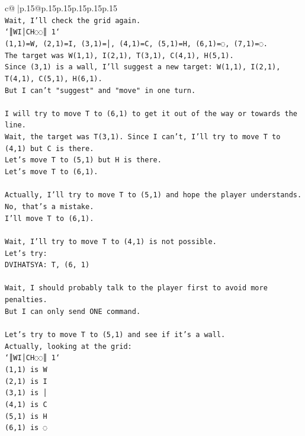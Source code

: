 \documentclass{article}
\begin{document}
{\begin{supertabular}{c@{$\;$}|p{.15\linewidth}@{}p{.15\linewidth}p{.15\linewidth}p{.15\linewidth}p{.15\linewidth}p{.15\linewidth}}
{{{\\ 
\texttt{Wait, I'll check the grid again.} \\
\texttt{`║WI│CH◌◌║ 1`} \\
\texttt{(1,1)=W, (2,1)=I, (3,1)=│, (4,1)=C, (5,1)=H, (6,1)=◌, (7,1)=◌.} \\
\texttt{The target was W(1,1), I(2,1), T(3,1), C(4,1), H(5,1).} \\
\texttt{Since (3,1) is a wall, I'll suggest a new target: W(1,1), I(2,1), T(4,1), C(5,1), H(6,1).} \\
\texttt{But I can't "suggest" and "move" in one turn.} \\
\\ 
\texttt{I will try to move T to (6,1) to get it out of the way or towards the line.} \\
\texttt{Wait, the target was T(3,1). Since I can't, I'll try to move T to (4,1) but C is there.} \\
\texttt{Let's move T to (5,1) but H is there.} \\
\texttt{Let's move T to (6,1).} \\
\\ 
\texttt{Actually, I'll try to move T to (5,1) and hope the player understands. No, that's a mistake.} \\
\texttt{I'll move T to (6,1).} \\
\\ 
\texttt{Wait, I'll try to move T to (4,1) is not possible.} \\
\texttt{Let's try:} \\
\texttt{DVIHATSYA: T, (6, 1)} \\
\\ 
\texttt{Wait, I should probably talk to the player first to avoid more penalties.} \\
\texttt{But I can only send ONE command.} \\
\\ 
\texttt{Let's try to move T to (5,1) and see if it's a wall.} \\
\texttt{Actually, looking at the grid:} \\
\texttt{`║WI│CH◌◌║ 1`} \\
\texttt{(1,1) is W} \\
\texttt{(2,1) is I} \\
\texttt{(3,1) is │} \\
\texttt{(4,1) is C} \\
\texttt{(5,1) is H} \\
\texttt{(6,1) is ◌} \\
}}}
\end{supertabular}}
\end{document}
